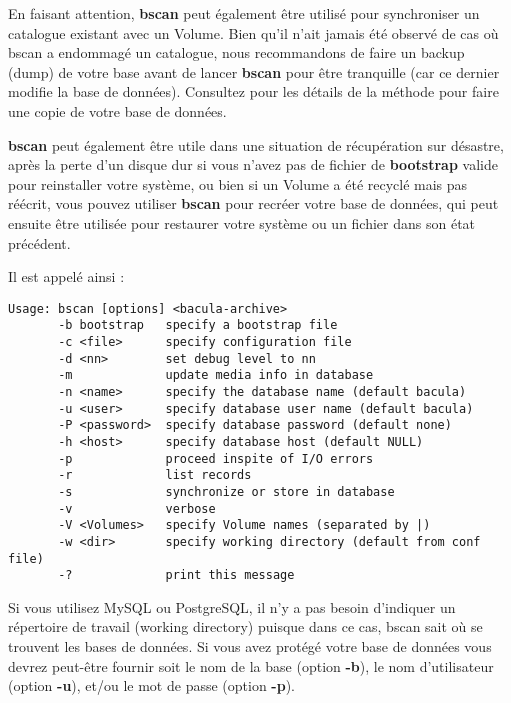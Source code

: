En faisant attention, {\bf bscan} peut également être utilisé pour 
synchroniser un catalogue existant avec un Volume.  Bien qu'il n'ait jamais été
observé de cas où bscan a endommagé un catalogue, nous recommandons de faire
un backup (dump) de votre base avant de lancer {\bf bscan} pour être tranquille
(car ce dernier modifie la base de données). Consultez
 pour les détails
de la méthode pour faire une copie de votre base de données.

{\bf bscan} peut également être utile dans une situation de récupération sur
désastre, après la perte d'un disque dur si vous n'avez pas de fichier de
{\bf bootstrap} valide pour reinstaller votre système, ou bien si un Volume a
été recyclé mais pas réécrit, vous pouvez utiliser {\bf bscan} pour recréer
votre base de données, qui peut ensuite être utilisée pour restaurer votre
système ou un fichier dans son état précédent.

Il est appelé ainsi : 

\footnotesize
\begin{verbatim}
Usage: bscan [options] <bacula-archive>
       -b bootstrap   specify a bootstrap file
       -c <file>      specify configuration file
       -d <nn>        set debug level to nn
       -m             update media info in database
       -n <name>      specify the database name (default bacula)
       -u <user>      specify database user name (default bacula)
       -P <password>  specify database password (default none)
       -h <host>      specify database host (default NULL)
       -p             proceed inspite of I/O errors
       -r             list records
       -s             synchronize or store in database
       -v             verbose
       -V <Volumes>   specify Volume names (separated by |)
       -w <dir>       specify working directory (default from conf file)
       -?             print this message
\end{verbatim}
\normalsize

Si vous utilisez MySQL ou PostgreSQL, il n'y a pas besoin d'indiquer un
répertoire de travail (working directory) puisque dans ce cas, bscan sait où
se trouvent les bases de données. Si vous avez protégé votre base de données
vous devrez peut-être fournir soit le nom de la base (option {\bf -b}), le
nom d'utilisateur (option {\bf -u}), et/ou le mot de passe (option {\bf -p}). 

